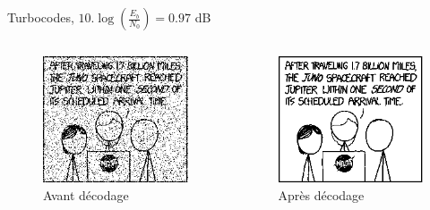 \documentclass[11pt]{beamer}
\begin{document}
\begin{frame}{Turbocodes, $10.\log(\frac{E_b}{N_0}) = 0.97$ dB}
	\begin{columns}
		\begin{column}{.5\textwidth}
			\begin{figure}
				\includegraphics[scale=0.6]{turbo_noisy_80}\\
				Avant d\'ecodage
			\end{figure}
		\end{column}
		\begin{column}{.5\textwidth}
			\begin{figure}
				\includegraphics[scale=0.6]{turbo_decoded_80}\\
				Apr\`es d\'ecodage
			\end{figure}
		\end{column}
	\end{columns}
\end{frame}
\end{document}
